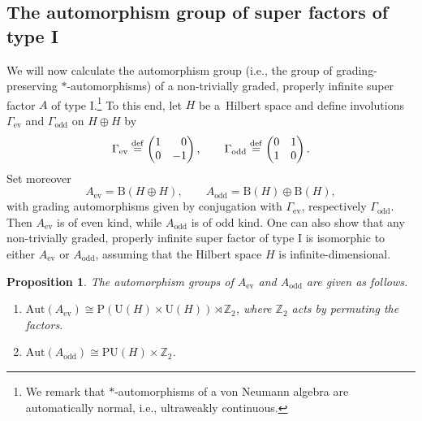 \documentclass[11pt]{article}
\numberwithin{equation}{section}
\numberwithin{equation}{section}
\newtheorem{Proposition}[Theorem]{Proposition}
\newcommand{\Z}{\mathbb{Z}}
\newcommand{\B}{\mathrm{B}}
\newcommand{\Aut}{\mathrm{Aut}}
\newcommand{\U}{\mathrm{U}}
\begin{document}
\subsection{The automorphism group of super factors of type I}

We will now calculate the automorphism group (i.e., the group of grading-preserving $*$-automor\-phisms) of a non-trivially graded, properly infinite super factor $A$ of type I.\footnote{We remark that $*$-automorphisms of a von Neumann algebra are automatically normal, i.e., ultraweakly continuous.}
To this end, let $H$ be a~Hilbert space and define involutions $\Gamma_{\mathrm{ev}}$ and $\Gamma_{\mathrm{odd}}$ on $H\oplus H$ by
\begin{equation} \label{GammaMatrices}
\Gamma_{\mathrm{ev}}  \stackrel{\mathrm{def}}{=}  \begin{pmatrix} 1 & \hphantom{-}0 \\ 0 & -1 \end{pmatrix}, \qquad
\Gamma_{\mathrm{odd}}  \stackrel{\mathrm{def}}{=}  \begin{pmatrix} 0 & 1 \\ 1 & 0 \end{pmatrix}.
\end{equation}
Set moreover
\begin{equation*}
 A_{\mathrm{ev}} = \B(H \oplus H), \qquad A_{\mathrm{odd}} = \B(H) \oplus \B(H),
\end{equation*}
with grading automorphisms given by conjugation with $\Gamma_{\mathrm{ev}}$, respectively $\Gamma_{\mathrm{odd}}$.
Then $A_{\mathrm{ev}}$ is of even kind, while $A_{\mathrm{odd}}$ is of odd kind.
One can also show that any non-trivially graded, properly infinite super factor of type I is isomorphic to either $A_{\mathrm{ev}}$ or $A_{\mathrm{odd}}$, assuming that the Hilbert space $H$ is infinite-dimensional.

\begin{Proposition} \label{PropositionAutomorphismGroups}
The automorphism groups of $A_{\mathrm{ev}}$ and $A_{\mathrm{odd}}$ are given as follows.
\begin{enumerate}\itemsep=0pt
\item[$(i)$] $\Aut(A_{\mathrm{ev}}) \cong \mathrm{P}(\U(H) \times \U(H)) \rtimes \Z_2$, where $\Z_2$ acts by permuting the factors.
\item[$(ii)$] $\Aut(A_{\mathrm{odd}}) \cong \mathrm{PU}(H) \times \Z_2$.
\end{enumerate}
\end{Proposition}
\end{document}
